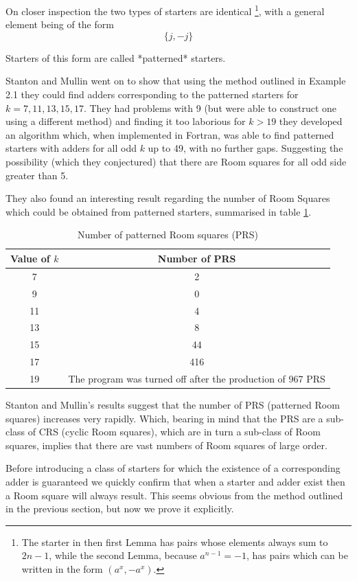 \documentclass[
  11pt,
  a4paper]{book}\usepackage[]{graphicx}\usepackage[]{xcolor}
\begin{document}
On closer inspection the two types of starters are
identical
\footnote{The starter in then first Lemma has pairs whose elements always
    sum to $2n-1$, while the second Lemma, because $a^{n-1}=-1$, has
    pairs which can be written in the form $(a^x,-a^x)$.},
with a general element being of the form
$$\{j,-j\}$$

Starters of this form are called *patterned* starters.

Stanton and Mullin went on to show that using the method
outlined in Example 2.1 they could find adders corresponding
to the patterned starters for $k = 7, 11, 13, 15, 17$. They had
problems with 9 (but were able to construct one using a
different method) and finding it too laborious for $k > 19$
they developed an algorithm which, when implemented in
Fortran, was able to find patterned starters with adders for
all odd $k$ up to 49, with no further gaps. Suggesting the
possibility (which they conjectured) that there are Room
squares for all odd side greater than 5.

They also found an interesting result regarding the number
of Room Squares which could be obtained from patterned
starters, summarised in table \ref{tab:patterned}. 

\begin{table}[h!]
  \begin{center}
    \caption{Number of patterned Room squares (PRS)}
    \label{tab:patterned}
    \begin{tabular}{c|c}
    Value of $k$ & Number of PRS \\ \hline
    7 & 2 \\
    9 & 0 \\
    11 & 4 \\
    13 & 8 \\
    15 & 44 \\
    17 & 416 \\
    19 & The program was turned off after the production of 967 PRS
    \end{tabular}
  \end{center}
\end{table}

Stanton and Mullin’s results suggest that the number of PRS
(patterned Room squares) increases very rapidly. Which,
bearing in mind that the PRS are a sub-class of CRS (cyclic
Room squares), which are in turn a sub-class of Room
squares, implies that there are vast numbers of Room squares
of large order.

Before introducing a class of starters for which the
existence of a corresponding adder is guaranteed we quickly
confirm that when a starter and adder exist then a Room
square will always result. This seems obvious from the
method outlined in the previous section, but now we prove it
explicitly.
\end{document}
